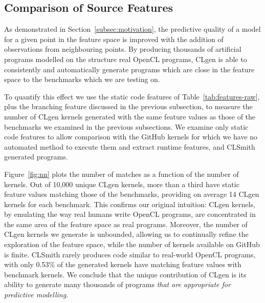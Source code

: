 \subsection{Comparison of Source Features}%
\label{subsec:eval-features}

As demonstrated in Section~\ref{subsec:motivation}, the predictive quality of a model for a given point in the feature space is improved with the addition of observations from neighbouring points. By producing thousands of artificial programs modelled on the structure real OpenCL programs, CLgen is able to consistently and automatically generate programs which are close in the feature space to the benchmarks which we are testing on.

To quantify this effect we use the static code features of Table~\ref{tab:features-raw}, plus the branching feature discussed in the previous subsection, to measure the number of CLgen kernels generated with the same feature values as those of the benchmarks we examined in the previous subsections. We examine only static code features to allow comparison with the GitHub kernels for which we have no automated method to execute them and extract runtime features, and CLSmith generated programs.

Figure~\ref{fig:nn} plots the number of matches as a function of the number of kernels. Out of 10,000 unique CLgen kernels, more than a third have static feature values matching those of the benchmarks, providing on average 14 CLgen kernels for each benchmark. This confirms our original intuition: CLgen kernels, by emulating the way real humans write OpenCL programs, are concentrated in the same area of the feature space as real programs. Moreover, the number of CLgen kernels we generate is unbounded, allowing us to continually refine the exploration of the feature space, while the number of kernels available on GitHub is finite. CLSmith rarely produces code similar to real-world OpenCL programs, with only 0.53\% of the generated kernels have matching feature values with benchmark kernels. We conclude that the unique contribution of CLgen is its ability to generate many thousands of programs \textit{that are appropriate for predictive modelling}.

